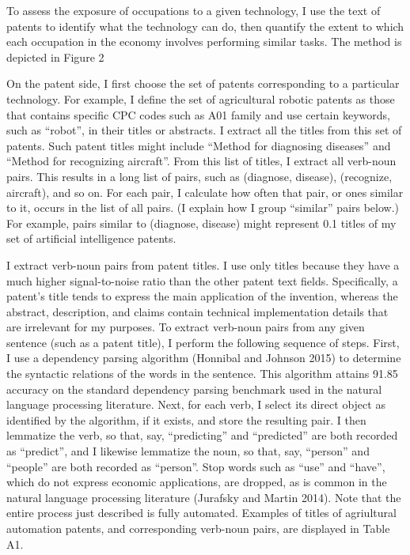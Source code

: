 \documentclass[11pt]{article}
\begin{document}
To assess the exposure of occupations to a given technology, I use the text of patents to identify
what the technology can do, then quantify the extent to which each occupation in the economy
involves performing similar tasks. The method is depicted in Figure 2

On the patent side, I first choose the set of patents corresponding to a particular technology.
For example, I define the set of agricultural robotic patents as those that contains specific CPC codes such as A01 family and use certain keywords,
such as “robot”, in their titles or abstracts. I extract all the titles from this set of patents.
Such patent titles might include “Method for diagnosing diseases” and “Method for recognizing
aircraft”. From this list of titles, I extract all verb-noun pairs. This results in a long list of pairs, such
as (diagnose, disease), (recognize, aircraft), and so on. For each pair, I calculate how often that pair,
or ones similar to it, occurs in the list of all pairs. (I explain how I group “similar” pairs below.) For
example, pairs similar to (diagnose, disease) might represent 0.1%
titles of my set of artificial intelligence patents.

I extract verb-noun pairs from patent titles. I use only titles because they have a much higher
signal-to-noise ratio than the other patent text fields. Specifically, a patent’s title tends to express the
main application of the invention, whereas the abstract, description, and claims contain technical
implementation details that are irrelevant for my purposes.
To extract verb-noun pairs from any given sentence (such as a patent title), I perform the
following sequence of steps. First, I use a dependency parsing algorithm (Honnibal and Johnson
2015) to determine the syntactic relations of the words in the sentence. This algorithm attains 91.85%
accuracy on the standard dependency parsing benchmark used in the natural language processing
literature. Next, for each verb, I select its direct object as identified by the algorithm, if it exists,
and store the resulting pair. I then lemmatize the verb, so that, say, “predicting” and “predicted”
are both recorded as “predict”, and I likewise lemmatize the noun, so that, say, “person” and “people” are
both recorded as “person”. Stop words such as “use” and “have”, which do not express economic
applications, are dropped, as is common in the natural language processing literature (Jurafsky
and Martin 2014). Note that the entire process just described is fully automated. Examples of titles
of agriultural automation patents, and corresponding verb-noun pairs, are displayed in Table A1.
\end{document}
